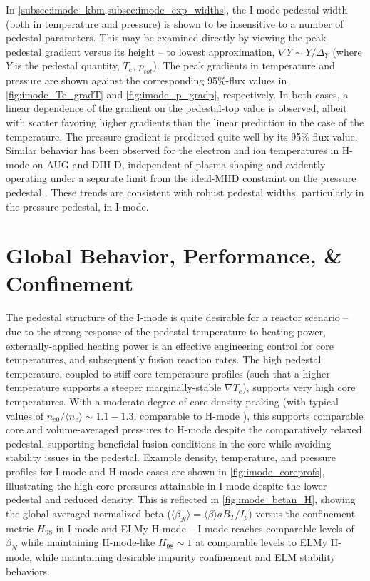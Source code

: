 In \cref{subsec:imode_kbm,subsec:imode_exp_widths}, the I-mode pedestal width (both in temperature and pressure) is shown to be insensitive to a number of pedestal parameters.  This may be examined directly by viewing the peak pedestal gradient versus its height -- to lowest approximation, $\nabla Y \sim Y/\Delta_Y$ (where $Y$ is the pedestal quantity, \ie $T_e$, $p_{tot}$).  The peak gradients in temperature and pressure are shown against the corresponding 95\%-flux values in \cref{fig:imode_Te_gradT} and \cref{fig:imode_p_gradp}, respectively.  In both cases, a linear dependence of the gradient on the pedestal-top value is observed, albeit with scatter favoring higher gradients than the linear prediction in the case of the temperature.  The pressure gradient is predicted quite well by its 95\%-flux value.  Similar behavior has been observed for the electron and ion temperatures in H-mode on AUG and DIII-D, independent of plasma shaping and evidently operating under a separate limit from the ideal-MHD constraint on the pressure pedestal \cite{Schneider2013}.  These trends are consistent with robust pedestal widths, particularly in the pressure pedestal, in I-mode.\nicesectionending

\section{Global Behavior, Performance, \& Confinement}\label{sec:imode_confinement}

The pedestal structure of the I-mode is quite desirable for a reactor scenario -- due to the strong response of the pedestal temperature to heating power, externally-applied heating power is an effective engineering control for core temperatures, and subsequently fusion reaction rates.  The high pedestal temperature, coupled to stiff core temperature profiles (such that a higher temperature supports a steeper marginally-stable $\nabla T_e$), supports very high core temperatures.  With a moderate degree of core density peaking (with typical values of $n_{e0}/\langle n_e \rangle \sim 1.1-1.3$, comparable to H-mode \cite{Greenwald2007a}), this supports comparable core and volume-averaged pressures to H-mode despite the comparatively relaxed pedestal, supporting beneficial fusion conditions in the core while avoiding stability issues in the pedestal.  Example density, temperature, and pressure profiles for I-mode and H-mode cases are shown in \cref{fig:imode_coreprofs}, illustrating the high core pressures attainable in I-mode despite the lower pedestal and reduced density.  This is reflected in \cref{fig:imode_betan_H}, showing the global-averaged normalized beta ($\langle \beta_N \rangle = \langle \beta \rangle a B_T/I_p$) versus the confinement metric $H_{98}$ in I-mode and ELMy H-mode -- I-mode reaches comparable levels of $\beta_N$ while maintaining H-mode-like $H_{98} \sim 1$ at comparable levels to ELMy H-mode, while maintaining desirable impurity confinement and ELM stability behaviors.

